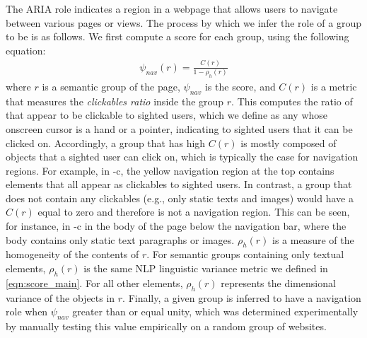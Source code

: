The  ARIA role indicates a region in a webpage that 
allows users to navigate between various pages or views. 
The process by which we infer the role of a group to be 
is as follows. 
We first compute a score for each group, using the 
following equation:
\begin{align} \label{eqn:score_nav}
    \psi_{nav}(r) = \frac{C(r)}{1 - \rho_h(r)} 
\end{align}
where $r$ is a semantic group of the page, $\psi_{nav}$ is the score, 
and $C(r)$ is a metric that measures the \emph{clickables ratio} 
inside the group $r$. This computes the ratio of {\vizobjs} 
that appear to be clickable to sighted users, which we define as 
any {\vizobj} whose onscreen cursor is a hand or a pointer, 
indicating to sighted users that it can be clicked on. 
Accordingly, a group that has high $C(r)$ is mostly composed 
of objects that a sighted user can click on, which is typically the case 
for navigation regions. 
For example, in -c, the yellow 
navigation region at the top contains elements that all appear 
as clickables to sighted users. 
In contrast, a group that does not contain any clickables 
(e.g., only static texts and images) would have a $C(r)$ equal to zero and 
therefore is not a navigation region. 
This can be seen, for instance, in -c 
in the body of the page below the navigation bar, where the body 
contains only static text paragraphs or images. 
$\rho_h(r)$ is a measure of the homogeneity of the contents of $r$. 
For semantic groups containing only textual elements, 
$\rho_h(r)$ is the same NLP linguistic 
variance metric we defined in \cref{eqn:score_main}. 
For all other elements, $\rho_h(r)$ represents the dimensional variance 
of the objects in $r$.
Finally, a given group is inferred to have a navigation role 
when $\psi_{nav}$ greater than or equal unity, which was determined experimentally by manually testing this value empirically on a random group of websites.



